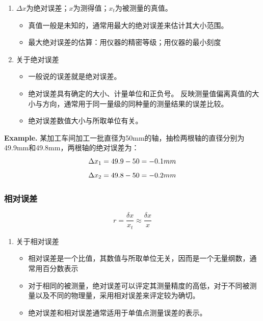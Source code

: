 \documentclass[UTF8]{ctexart}
\begin{document}
\begin{enumerate}[•]
\item $\Delta x$为绝对误差；$x$为测得值；$x_t$为被测量的真值。
  \begin{itemize}
  \item 真值一般是未知的，通常用最大的绝对误差来估计其大小范围。
  \item 最大绝对误差的估算：用仪器的精密等级；用仪器的最小刻度
  \end{itemize} 
\item 关于绝对误差
\begin{itemize}
\item 一般说的误差就是绝对误差。
\item 绝对误差具有确定的大小、计量单位和正负号。
      反映测量值偏离真值的大小与方向，通常用于同一量级的同种量的测量结果的误差比较。
\item 绝对误差数值大小与所取单位有关。

\end{itemize} 
\end{enumerate}

\textbf{Example.}
某加工车间加工一批直径为50mm的轴，抽检两根轴的直径分别为49.9mm和49.8mm，两根轴的绝对误差为：
\begin{equation}\notag
  \Delta x_{1}=49.9-50=-0.1mm
\end{equation}
\begin{equation}\notag
  \Delta x_{2}=49.8-50=-0.2mm
\end{equation}

\subsubsection{相对误差}
\begin{equation}
  r=\frac{\delta  x}{x_{t}}\approx \frac{\delta x}{x}
\end{equation}



\begin{enumerate}[•]
\item 关于相对误差
  \begin{itemize}
  \item 相对误差是一个比值，其数值与所取单位无关，因而是一个无量纲数，通常用百分数表示
  \item 对于相同的被测量，绝对误差可以评定其测量精度的高低，对于不同被测量以及不同的物理量，采用相对误差来评定较为确切。
  \item 绝对误差和相对误差通常适用于单值点测量误差的表示。
  \end{itemize} 
\end{enumerate}
\end{document}

